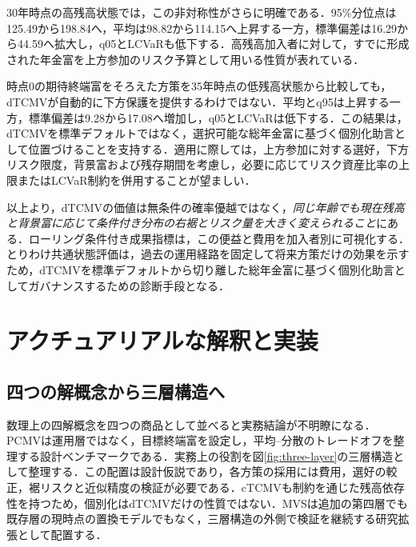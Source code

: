 \documentclass[10pt,a4paper]{article}
\theoremstyle{plain}
\theoremstyle{definition}
\begin{document}
30年時点の高残高状態では，この非対称性がさらに明確である．95\%分位点は125.49から198.84へ，平均は98.82から114.15へ上昇する一方，標準偏差は16.29から44.59へ拡大し，q05とLCVaRも低下する．高残高加入者に対して，すでに形成された年金富を上方参加のリスク予算として用いる性質が表れている．

時点0の期待終端富をそろえた方策を35年時点の低残高状態から比較しても，dTCMVが自動的に下方保護を提供するわけではない．平均とq95は上昇する一方，標準偏差は9.28から17.08へ増加し，q05とLCVaRは低下する．この結果は，dTCMVを標準デフォルトではなく，選択可能な総年金富に基づく個別化助言として位置づけることを支持する．適用に際しては，上方参加に対する選好，下方リスク限度，背景富および残存期間を考慮し，必要に応じてリスク資産比率の上限またはLCVaR制約を併用することが望ましい．

以上より，dTCMVの価値は無条件の確率優越ではなく，\emph{同じ年齢でも現在残高と背景富に応じて条件付き分布の右裾とリスク量を大きく変えられること}にある．ローリング条件付き成果指標は，この便益と費用を加入者別に可視化する．とりわけ共通状態評価は，過去の運用経路を固定して将来方策だけの効果を示すため，dTCMVを標準デフォルトから切り離した総年金富に基づく個別化助言としてガバナンスするための診断手段となる．

\section{アクチュアリアルな解釈と実装}\label{sec:implementation}

\subsection{四つの解概念から三層構造へ}
数理上の四解概念を四つの商品として並べると実務結論が不明瞭になる．PCMVは運用層ではなく，目標終端富を設定し，平均--分散のトレードオフを整理する設計ベンチマークである．実務上の役割を図\ref{fig:three-layer}の三層構造として整理する．この配置は設計仮説であり，各方策の採用には費用，選好の較正，裾リスクと近似精度の検証が必要である．cTCMVも制約を通じた残高依存性を持つため，個別化はdTCMVだけの性質ではない．MVSは追加の第四層でも既存層の現時点の置換モデルでもなく，三層構造の外側で検証を継続する研究拡張として配置する．
\end{document}
